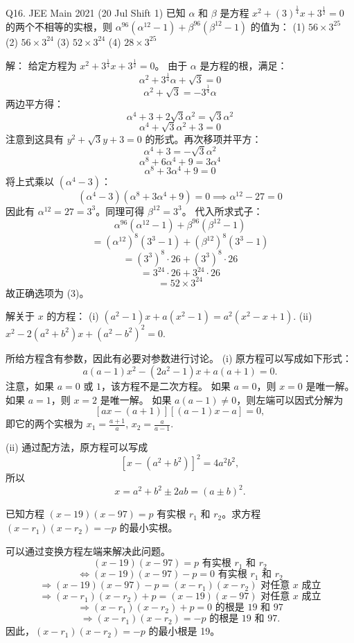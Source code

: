\begin{questions}
    \question Q16. JEE Main 2021 (20 Jul Shift 1)
已知 $\alpha$ 和 $\beta$ 是方程 $x^2 + (3)^{\frac{1}{4}}x + 3^{\frac{1}{2}} = 0$ 的两个不相等的实根，则 $\alpha^{96}(\alpha^{12} - 1) + \beta^{96}(\beta^{12} - 1)$ 的值为：
(1) $56 \times 3^{25}$ \quad (2) $56 \times 3^{24}$ \quad (3) $52 \times 3^{24}$ \quad (4) $28 \times 3^{25}$

\begin{solution}
解：
给定方程为 $x^2 + 3^{\frac{1}{4}}x + 3^{\frac{1}{2}} = 0$。
由于 $\alpha$ 是方程的根，满足：
\[
\alpha^2 + 3^{\frac{1}{4}}\alpha + \sqrt{3} = 0
\]
\[
\alpha^2 + \sqrt{3} = -3^{\frac{1}{4}}\alpha
\]
两边平方得：
\[
\alpha^4 + 3 + 2\sqrt{3}\alpha^2 = \sqrt{3}\alpha^2
\]
\[
\alpha^4 + \sqrt{3}\alpha^2 + 3 = 0
\]
注意到这具有 $y^2 + \sqrt{3}y + 3 = 0$ 的形式。再次移项并平方：
\[
\alpha^4 + 3 = -\sqrt{3}\alpha^2
\]
\[
\alpha^8 + 6\alpha^4 + 9 = 3\alpha^4
\]
\[
\alpha^8 + 3\alpha^4 + 9 = 0
\]
将上式乘以 $(\alpha^4 - 3)$：
\[
(\alpha^4 - 3)(\alpha^8 + 3\alpha^4 + 9) = 0 \implies \alpha^{12} - 27 = 0
\]
因此有 $\alpha^{12} = 27 = 3^3$。同理可得 $\beta^{12} = 3^3$。
代入所求式子：
\[
\alpha^{96}(\alpha^{12} - 1) + \beta^{96}(\beta^{12} - 1)
\]
\[
= (\alpha^{12})^8 (3^3 - 1) + (\beta^{12})^8 (3^3 - 1)
\]
\[
= (3^3)^8 \cdot 26 + (3^3)^8 \cdot 26
\]
\[
= 3^{24} \cdot 26 + 3^{24} \cdot 26
\]
\[
= 52 \times 3^{24}
\]
故正确选项为 (3)。
\end{solution}

\question 解关于 $x$ 的方程：
(i) $(a^2 - 1)x + a(x^2 - 1) = a^2(x^2 - x + 1)$.
(ii) $x^2 - 2(a^2 + b^2)x + (a^2 - b^2)^2 = 0$.

\begin{solution}
所给方程含有参数，因此有必要对参数进行讨论。
(i) 原方程可以写成如下形式：
\[
a(a - 1)x^2 - (2a^2 - 1)x + a(a + 1) = 0.
\]
注意，如果 $a = 0$ 或 $1$，该方程不是二次方程。
如果 $a = 0$，则 $x = 0$ 是唯一解。
如果 $a = 1$，则 $x = 2$ 是唯一解。
如果 $a(a - 1) \neq 0$，则左端可以因式分解为
\[
[ax - (a + 1)][(a - 1)x - a] = 0,
\]
即它的两个实根为 $x_1 = \frac{a + 1}{a}$, $x_2 = \frac{a}{a - 1}$.

(ii) 通过配方法，原方程可以写成
\[
[x - (a^2 + b^2)]^2 = 4a^2b^2,
\]
所以
\[
x = a^2 + b^2 \pm 2ab = (a \pm b)^2.
\]
\end{solution}

\question 已知方程 $(x - 19)(x - 97) = p$ 有实根 $r_1$ 和 $r_2$。求方程 $(x - r_1)(x - r_2) = -p$ 的最小实根。

\begin{solution}
可以通过变换方程左端来解决此问题。
\[
(x - 19)(x - 97) = p \text{ 有实根 } r_1 \text{ 和 } r_2
\]
\[
\iff (x - 19)(x - 97) - p = 0 \text{ 有实根 } r_1 \text{ 和 } r_2
\]
\[
\Rightarrow (x - 19)(x - 97) - p = (x - r_1)(x - r_2) \text{ 对任意 } x \text{ 成立}
\]
\[
\Rightarrow (x - r_1)(x - r_2) + p = (x - 19)(x - 97) \text{ 对任意 } x \text{ 成立}
\]
\[
\Rightarrow (x - r_1)(x - r_2) + p = 0 \text{ 的根是 } 19 \text{ 和 } 97
\]
\[
\Rightarrow (x - r_1)(x - r_2) = -p \text{ 的根是 } 19 \text{ 和 } 97.
\]
因此，$(x - r_1)(x - r_2) = -p$ 的最小根是 19。
\end{solution}


\end{questions}
